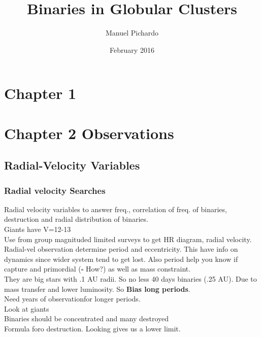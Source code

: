 \documentclass{article}
\title{Binaries in Globular Clusters}
\author{Manuel Pichardo}
\date{February 2016}
\newcounter{para}[subsubsection]
\newcommand{\parnum}{(\arabic{parcount})}
\newcounter{parcount}
\newenvironment{parnumbers}{%
	\setcounter{parcount}{0}
   \par%
   \everypar{\noindent \stepcounter{parcount}\parnum \hspace{1em}}%
}{}
\begin{document}
\maketitle


\section{Chapter 1}


\section{Chapter 2 Observations}

\setcounter{para}{1}

\subsection{Radial-Velocity Variables}
\subsubsection{Radial velocity Searches}

\begin{parnumbers}

Radial velocity variables to answer freq., correlation of freq. of binaries, destruction and radial distribution of binaries. \\ 

Giants have V=12-13 \\

Use from group magnituded limited surveys to get HR diagram, radial velocity. \\

Radial-vel observation determine period and eccentricity. This have info on dynamics since wider system tend to get lost. Also period help you know if capture and primordial ($\square$ How?) as well as mass constraint. \\

They are big stars with .1 AU radii. So no less 40 days binaries (.25 AU). Due to mass transfer and lower luminosity. So \textbf{Bias long periods}.\\

Need years of observationfor longer periods. \\ 

Look at giants\\

Binaries should be concentrated and many destroyed \\

Formula foro destruction. Looking gives us a lower limit. \\

\end{parnumbers}
\end{document}
